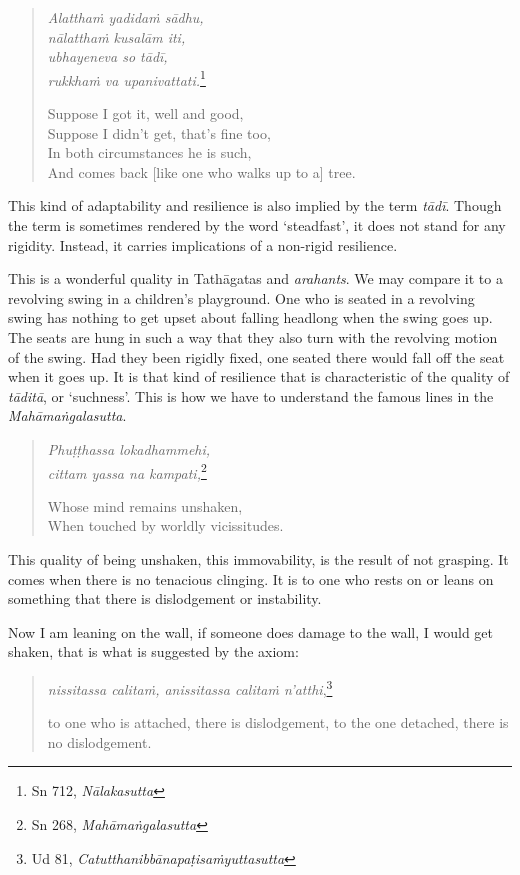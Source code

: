 \begin{quote}
\emph{Alatthaṁ yadidaṁ sādhu,}\\
\emph{nālatthaṁ kusalām iti,}\\
\emph{ubhayeneva so tādī,}\\
\emph{rukkhaṁ va upanivattati.}\footnote{Sn 712, \emph{Nālakasutta}}

Suppose I got it, well and good,\\
Suppose I didn't get, that's fine too,\\
In both circumstances he is such,\\
And comes back [like one who walks up to a] tree.
\end{quote}

This kind of adaptability and resilience is also implied by the term \emph{tādī}. Though the term is sometimes rendered by the word `steadfast', it does not stand for any rigidity. Instead, it carries implications of a non-rigid resilience.

This is a wonderful quality in Tathāgatas and \emph{arahants}. We may compare it to a revolving swing in a children's playground. One who is seated in a revolving swing has nothing to get upset about falling headlong when the swing goes up. The seats are hung in such a way that they also turn with the revolving motion of the swing. Had they been rigidly fixed, one seated there would fall off the seat when it goes up. It is that kind of resilience that is characteristic of the quality of \emph{tāditā}, or `suchness'. This is how we have to understand the famous lines in the \emph{Mahāmaṅgalasutta}.

\begin{quote}
\emph{Phuṭṭhassa lokadhammehi,}\\
\emph{cittam yassa na kampati,}\footnote{Sn 268, \emph{Mahāmaṅgalasutta}}

Whose mind remains unshaken,\\
When touched by worldly vicissitudes.
\end{quote}

This quality of being unshaken, this immovability, is the result of not grasping. It comes when there is no tenacious clinging. It is to one who rests on or leans on something that there is dislodgement or instability.

Now I am leaning on the wall, if someone does damage to the wall, I would get shaken, that is what is suggested by the axiom:

\begin{quote}
\emph{nissitassa calitaṁ, anissitassa calitaṁ n'atthi},\footnote{Ud 81, \emph{Catutthanibbānapaṭisaṁyuttasutta}}

to one who is attached, there is dislodgement, to the one detached, there is no dislodgement.
\end{quote}


